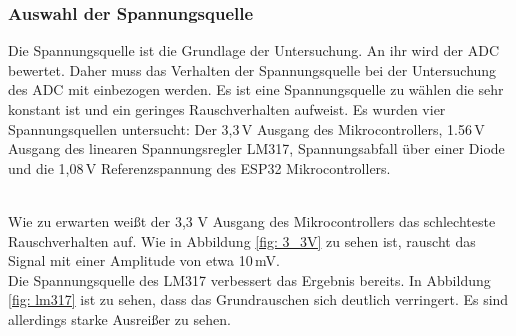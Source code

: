 \subsubsection{Auswahl der Spannungsquelle}
Die Spannungsquelle ist die Grundlage der Untersuchung. An ihr wird der ADC bewertet. Daher muss das Verhalten der Spannungsquelle bei der Untersuchung des ADC mit einbezogen werden. Es ist eine Spannungsquelle zu wählen die sehr konstant ist und ein geringes Rauschverhalten aufweist. Es wurden vier Spannungsquellen untersucht: Der 3,3\,V Ausgang des Mikrocontrollers, 1.56\,V Ausgang des linearen Spannungsregler LM317, Spannungsabfall über einer Diode und die 1,08\,V Referenzspannung des ESP32 Mikrocontrollers.
\\
\noindent
Wie zu erwarten weißt der 3,3 V Ausgang des Mikrocontrollers das schlechteste Rauschverhalten auf. Wie in Abbildung \ref{fig: 3_3V} zu sehen ist, rauscht das Signal mit einer Amplitude von etwa 10\,mV.
\\
Die Spannungsquelle des LM317 verbessert das Ergebnis bereits. In Abbildung \ref{fig: lm317} ist zu sehen, dass das Grundrauschen sich deutlich verringert. Es sind allerdings starke Ausreißer zu sehen.
